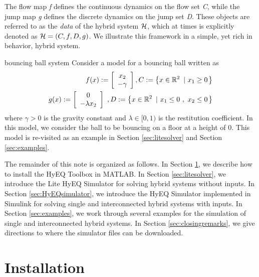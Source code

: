 \documentclass{article}
\begin{document}
The flow map {\it f} defines the continuous dynamics on the flow set {\it C}, while the jump map {\it g} defines the discrete dynamics on the jump set {\it D}. These objects are referred to as the {\it data} of the hybrid system $\mathcal{H}$, which at times is explicitly denoted as $\mathcal{H} = (C,f,D,g)$.  We illustrate this framework in a simple, yet rich in behavior, hybrid system.


\begin{example}{bouncing ball system}
\label{ex:bb}
Consider a model for a bouncing ball written as
\begin{eqnarray}
\label{eq:bbmodel}
f(x):=\left[
 \begin{array}{c}
   x_{2} \\
 -\gamma
 \end{array}
\right],
   C : = \defset{ x \in \Re^{2}}{x_{1} \geq 0} \\
\label{eq:bbmodel2}
g(x):=\left[ \begin{array}{c}
 0 \\
- \lambda x_{2}
\end{array}
\right]\ ,
    D: = \defset{ x \in \Re^{2}}{x_{1} \leq 0 \ , \
  x_{2} \leq 0}
\end{eqnarray}
where $\gamma >0$ is the gravity constant and $\lambda \in [0,1)$ is the restitution coefficient. In this model, we consider the ball to be bouncing on a floor at a height of $0$. This model is re-visited as an example in Section \ref{sec:litesolver} and Section \ref{sec:examples}.
\end{example}

The remainder of this note is organized as follows. In Section \ref{sec:installation}, we describe how to install the HyEQ Toolbox in MATLAB. In Section \ref{sec:litesolver}, we introduce the Lite HyEQ Simulator for solving hybrid systems without inputs. In Section \ref{sec:HyEQsimulator}, we introduce the HyEQ Simulator implemented in Simulink for solving single and interconnected hybrid systems with inputs.
In Section \ref{sec:examples}, we work through several examples for the simulation of single and interconnected hybrid systems. In Section \ref{sec:closingremarks}, we give directions to where the simulator files can be downloaded.

\section{Installation}
\label{sec:installation}
\end{document}
